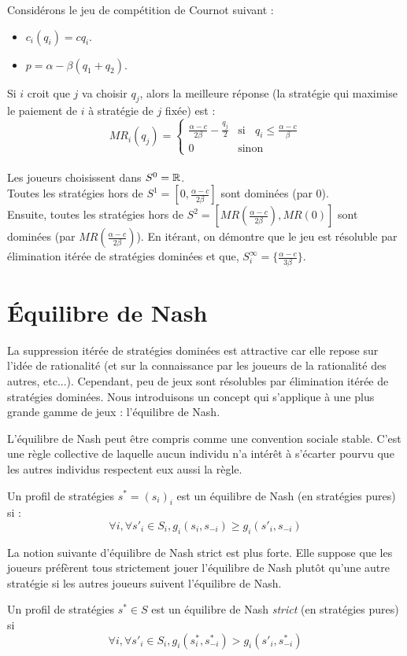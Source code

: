 \begin{exemple}
Considérons le jeu de compétition de Cournot suivant :
\begin{itemize}
\item $c_i(q_i) = c q_i$. \item $p = \alpha - \beta(q_1+q_2)$.
\end{itemize}
Si $i$ croit que $j$ va choisir $q_j$, alors la meilleure réponse
(la stratégie qui maximise le paiement de $i$ à stratégie de $j$
fixée) est :
$$
MR_i(q_j)=
\begin{cases}
  \frac{\alpha-c}{2\beta} - \frac{q_j}2 &\mbox{si }\;\; q_i \leq\frac{\alpha-c}{\beta}\\
   0 &\mbox{sinon }
\end{cases}$$\\
Les joueurs choisissent dans $S^0=\mathbb R$.\\
Toutes les stratégies hors de $S^1=[0,\frac{\alpha-c}{2\beta}]$
sont dominées
(par 0).\\
Ensuite, toutes les stratégies hors de
$S^2=[MR(\frac{\alpha-c}{2\beta}), MR(0)]$ sont dominées (par
$MR(\frac{\alpha-c}{2\beta})$). En itérant, on démontre que le jeu
est résoluble par élimination itérée de stratégies dominées et
que, $S_i^{\infty}=\{\frac{\alpha-c}{3\beta}\}$.
\end{exemple}

\section{\'Equilibre de Nash}
La suppression itérée de stratégies dominées est attractive car
elle repose sur l'idée de rationalité (et sur la connaissance par
les joueurs de la rationalité des autres, etc...). Cependant, peu
de jeux sont résolubles par élimination itérée de stratégies
dominées. Nous introduisons un concept qui s'applique à une plus
grande gamme de jeux : l'équilibre de Nash.

L'équilibre de Nash peut être compris comme une convention sociale
stable. C'est une règle collective de laquelle aucun individu n'a
intérêt à s'écarter pourvu que les autres individus respectent eux
aussi la règle.

\begin{definition} Un profil de stratégies $s^*=(s_i)_i$ est
un équilibre de Nash (en stratégies pures) si :
$$
\forall i, \forall s'_i\in S_i, g_i(s_i,s_{-i})\geq
g_i(s'_i,s_{-i})
$$
\end{definition}

La notion suivante d'équilibre de Nash strict est plus forte. Elle
suppose que les joueurs préfèrent tous strictement jouer
l'équilibre de Nash plutôt qu'une autre stratégie si les autres
joueurs suivent l'équilibre de Nash.
\begin{definition}  Un profil de stratégies $s^*\in S$ est un
équilibre de Nash {\em strict} (en stratégies pures) si
$$
\forall i, \forall s'_i \in S_i, g_i(s^*_i,s^*_{-i})>
g_i(s'_i,s^*_{-i})
$$
\end{definition}


